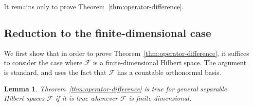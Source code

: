 \documentclass[11pt]{article} %
\newcommand{\<}{\langle}
\renewcommand{\>}{\rangle}
\def\cF{{\mathcal F}}
\def\cF{{\mathcal F}}
\theoremstyle{plain}
\newtheorem{lemma}[theorem]{Lemma}
\theoremstyle{definition}
\theoremstyle{remark}
\begin{document}
It remains only to prove Theorem~\ref{thm:operator-difference}.


\subsection{Reduction to the finite-dimensional case}

We first show that in order to prove Theorem~\ref{thm:operator-difference}, it suffices to consider the case where $\cF$ is a finite-dimensional Hilbert space. The argument is standard, and uses the fact that $\cF$ has a countable orthonormal basis.
\begin{lemma}\label{lem:reduce-to-finite-dim}
Theorem~\ref{thm:operator-difference} is true for general separable Hilbert spaces $\cF$ if it is true whenever $\cF$ is finite-dimensional.
\end{lemma}
\end{document}
